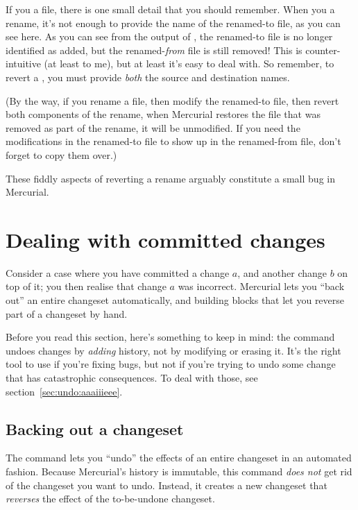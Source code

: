 If you  a file, there is one small detail that
you should remember.  When you  a rename, it's not
enough to provide the name of the renamed-to file, as you can see
here.
As you can see from the output of , the renamed-to file
is no longer identified as added, but the renamed-\emph{from} file is
still removed!  This is counter-intuitive (at least to me), but at
least it's easy to deal with.
So remember, to revert a , you must provide \emph{both}
the source and destination names.  


(By the way, if you rename a file, then modify the renamed-to file,
then revert both components of the rename, when Mercurial restores the
file that was removed as part of the rename, it will be unmodified.
If you need the modifications in the renamed-to file to show up in the
renamed-from file, don't forget to copy them over.)

These fiddly aspects of reverting a rename arguably constitute a small
bug in Mercurial.

\section{Dealing with committed changes}

Consider a case where you have committed a change $a$, and another
change $b$ on top of it; you then realise that change $a$ was
incorrect.  Mercurial lets you ``back out'' an entire changeset
automatically, and building blocks that let you reverse part of a
changeset by hand.

Before you read this section, here's something to keep in mind: the
 command undoes changes by \emph{adding} history, not
by modifying or erasing it.  It's the right tool to use if you're
fixing bugs, but not if you're trying to undo some change that has
catastrophic consequences.  To deal with those, see
section~\ref{sec:undo:aaaiiieee}.

\subsection{Backing out a changeset}

The  command lets you ``undo'' the effects of an entire
changeset in an automated fashion.  Because Mercurial's history is
immutable, this command \emph{does not} get rid of the changeset you
want to undo.  Instead, it creates a new changeset that
\emph{reverses} the effect of the to-be-undone changeset.

